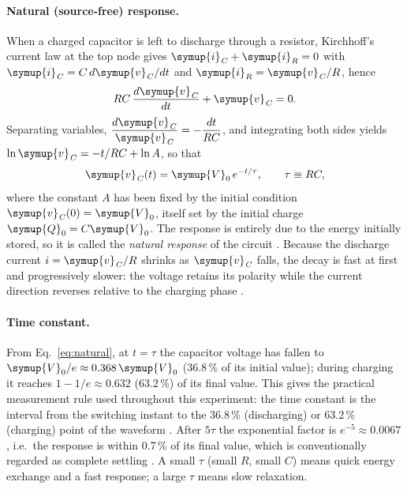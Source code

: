 \documentclass[12pt,a4paper]{article}
\begin{document}
	\paragraph{Natural (source-free) response.}
	When a charged capacitor is left to discharge through a resistor,
	Kirchhoff's current law at the top node gives $\symup{i}_{\mathit{C}} + \symup{i}_{\mathit{R}} = 0$ with
	$\symup{i}_{\mathit{C}} = C\,d\symup{v}_{\mathit{C}}/dt$ and $\symup{i}_{\mathit{R}} = \symup{v}_{\mathit{C}}/R$, hence
	\begin{equation}
		RC\,\frac{d\symup{v}_{\mathit{C}}}{dt} + \symup{v}_{\mathit{C}} = 0 .
		\label{eq:natural-ode}
	\end{equation}
	Separating variables, $\dfrac{d\symup{v}_{\mathit{C}}}{\symup{v}_{\mathit{C}}} = -\dfrac{dt}{RC}$, and
	integrating both sides yields
	$\ln \symup{v}_{\mathit{C}} = -t/RC + \ln A$, so that
	\begin{equation}
		\symup{v}_{\mathit{C}}(t) = \symup{V}_{0}\, e^{-t/\tau}, \qquad \tau \equiv RC,
		\label{eq:natural}
	\end{equation}
	where the constant $A$ has been fixed by the initial condition
	$\symup{v}_{\mathit{C}}(0) = \symup{V}_{0}$, itself set by the initial charge $\symup{Q}_{0} = C \symup{V}_{0}$.  The
	response is entirely due to the energy initially stored, so it is
	called the \emph{natural response} of the circuit \cite{sadiku}.
	Because the discharge current $i = \symup{v}_{\mathit{C}}/R$ shrinks as $\symup{v}_{\mathit{C}}$ falls, the
	decay is fast at first and progressively slower: the voltage retains
	its polarity while the current direction reverses relative to the
	charging phase \cite{boylestad}.
	
	\paragraph{Time constant.}
	From Eq.~\eqref{eq:natural}, at $t = \tau$ the capacitor voltage has
	fallen to $\symup{V}_{0}/e \approx 0.368\,\symup{V}_{0}$ (36.8\,\% of its initial value);
	during charging it reaches $1 - 1/e \approx 0.632$ (63.2\,\%) of its
	final value.  This gives the practical measurement rule used
	throughout this experiment: the time constant is the interval from the
	switching instant to the 36.8\,\% (discharging) or 63.2\,\%
	(charging) point of the waveform \cite{boylestad}.  After $5\tau$ the
	exponential factor is $e^{-5} \approx 0.0067$, i.e.\ the response is
	within 0.7\,\% of its final value, which is conventionally regarded
	as complete settling \cite{sadiku}.  A small $\tau$ (small $R$, small
	$C$) means quick energy exchange and a fast response; a large $\tau$
	means slow relaxation.
	
\end{document}
